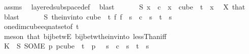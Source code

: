 \begin{isabellebody}
\ assms{\isacharparenleft}{\kern0pt}{}{\isacharparenright}{\kern0pt}\ \isamarkupfalse%
\ layered{\isacharunderscore}{\kern0pt}subspace{\isacharunderscore}{\kern0pt}def\ \isamarkupfalse%
\ blast\isanewline
\ \ \isamarkupfalse%
\ \isamarkupfalse%
\ {\isachardoublequoteopen}{\isacharparenleft}{\kern0pt}{\isasymchi}\ {\isacharparenleft}{\kern0pt}S\ x{\isacharparenright}{\kern0pt}\ {\isacharequal}{\kern0pt}\ c{}{\isacharparenright}{\kern0pt}{\isachardoublequoteclose}\ \ {\isachardoublequoteopen}x\ {\isasymin}\ cube\ {}\ t{\isachardoublequoteclose}\ \ x\ \isamarkupfalse%
\ X\ that\ \isamarkupfalse%
\ blast\isanewline
\ \ \isamarkupfalse%
\ \isamarkupfalse%
\ {\isachardoublequoteopen}{\isasymchi}\ {\isacharparenleft}{\kern0pt}S\ {\isacharparenleft}{\kern0pt}the{\isacharunderscore}{\kern0pt}inv{\isacharunderscore}{\kern0pt}into\ {\isacharparenleft}{\kern0pt}cube\ {}\ t{\isacharparenright}{\kern0pt}\ {\isacharparenleft}{\kern0pt}{\isasymlambda}f{\isachardot}{\kern0pt}\ f\ {}{\isacharparenright}{\kern0pt}\ s{\isacharparenright}{\kern0pt}{\isacharparenright}{\kern0pt}\ {\isacharequal}{\kern0pt}\ c{}{\isachardoublequoteclose}\ \ {\isachardoublequoteopen}s\ {\isacharless}{\kern0pt}\ t{\isachardoublequoteclose}\ \ s\ \isamarkupfalse%
\ one{\isacharunderscore}{\kern0pt}dim{\isacharunderscore}{\kern0pt}cube{\isacharunderscore}{\kern0pt}eq{\isacharunderscore}{\kern0pt}nat{\isacharunderscore}{\kern0pt}set{\isacharbrackleft}{\kern0pt}of\ t{\isacharbrackright}{\kern0pt}\ \isanewline
\ \ \ \ \isamarkupfalse%
\ {\isacharparenleft}{\kern0pt}meson\ that\ bij{\isacharunderscore}{\kern0pt}betwE\ bij{\isacharunderscore}{\kern0pt}betw{\isacharunderscore}{\kern0pt}the{\isacharunderscore}{\kern0pt}inv{\isacharunderscore}{\kern0pt}into\ lessThan{\isacharunderscore}{\kern0pt}iff{\isacharparenright}{\kern0pt}\isanewline
\ \ \isamarkupfalse%
\ \isamarkupfalse%
\ K{}{\isacharcolon}{\kern0pt}\ {\isachardoublequoteopen}{\isasymchi}\ {\isacharparenleft}{\kern0pt}S\ {\isacharparenleft}{\kern0pt}SOME\ p{\isachardot}{\kern0pt}\ p{\isasymin}cube\ {}\ {\isacharparenleft}{\kern0pt}t{\isacharplus}{\kern0pt}{}{\isacharparenright}{\kern0pt}\ {\isasymand}\ p\ {}\ {\isacharequal}{\kern0pt}\ s{\isacharparenright}{\kern0pt}{\isacharparenright}{\kern0pt}\ {\isacharequal}{\kern0pt}\ c{}{\isachardoublequoteclose}\ \ {\isachardoublequoteopen}s\ {\isacharless}{\kern0pt}\ t{\isachardoublequoteclose}\ \ s\ \isamarkupfalse%

\end{isabellebody}
